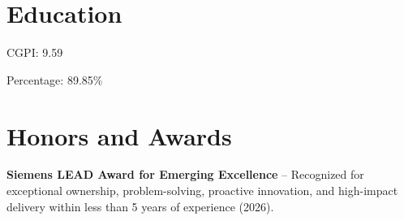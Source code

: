 \documentclass{resume}
\begin{document}
\section{Education}

{\fontsize{10pt}{13pt}\selectfont CGPI: 9.59}
\entryspace

{\fontsize{10pt}{13pt}\selectfont Percentage: 89.85\%}

\section{Honors and Awards}
\begin{tightemize}
\item \textbf{Siemens LEAD Award for Emerging Excellence} -- Recognized for exceptional ownership, problem-solving, proactive innovation, and high-impact delivery within less than 5 years of experience (2026).
\end{tightemize}
\end{document}
